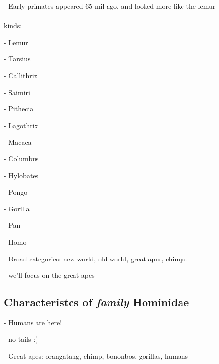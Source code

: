 \documentclass{article}
\theoremstyle{definition}
\begin{document}
- Early primates appeared 65 mil ago, and looked more like the lemur\\~\\

kinds:

- Lemur

- Tarsius

- Callithrix

- Saimiri

- Pithecia

- Lagothrix

- Macaca

- Columbus

- Hylobates

- Pongo

- Gorilla

- Pan

- Homo

- Broad categories: new world, old world, great apes, chimps

- we'll focus on the great apes

\subsection{Characteristcs of \textit{family} Hominidae}

- Humans are here!

- no tails :(

- Great apes: orangatang, chimp, bononbos, gorillas, humans
\end{document}
